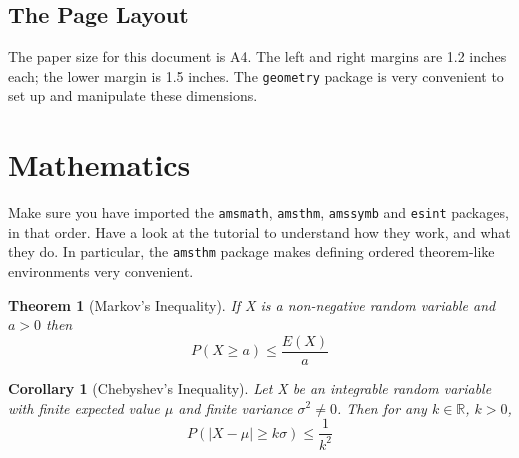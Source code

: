 \documentclass[a4paper]{article}
\begin{document}
\subsection*{The Page Layout}
The paper size for this document is A4. The left and right margins are 1.2 inches each; the lower margin is 1.5 inches. The \verb!geometry! package is very convenient to set up and manipulate these dimensions.

\newpage
\section{Mathematics}
Make sure you have imported the \verb!amsmath!, \verb!amsthm!, \verb!amssymb! and \verb!esint! packages, in that order.
Have a look at the tutorial to understand how they work, and what they do. In particular, the \verb!amsthm! package makes defining ordered theorem-like environments very convenient.

\newtheorem{thm}{Theorem}
\newtheorem{cor}{Corollary}
\theoremstyle{remark} \newtheorem*{remark}{Remark}

\begin{thm}[Markov's Inequality]
    \label{thm:markov}
    If X is a non-negative random variable and $a > 0$ then
    $$ P(X \geq a) \leq \frac{E(X)}{a} $$
\end{thm}

\setcounter{cor}{1}
\begin{cor}[Chebyshev's Inequality]
    \label{cor:2}
    Let X be an integrable random variable with finite expected
    value $\mu$ and finite variance $\sigma^2 \neq 0$. Then for any $k  \in \mathbb{R}$, $k > 0$,
    $$ P(|X-\mu| \geq k\sigma) \leq \frac{1}{k^2} $$
\end{cor}
\end{document}
